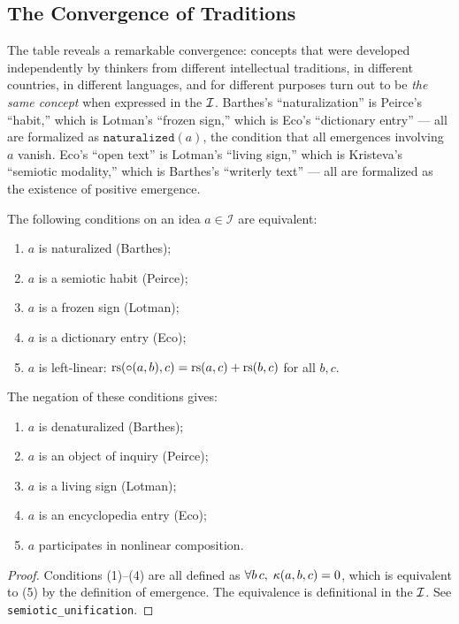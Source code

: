 \subsection{The Convergence of Traditions}

The table reveals a remarkable convergence: concepts that were developed
independently by thinkers from different intellectual traditions, in
different countries, in different languages, and for different purposes
turn out to be \emph{the same concept} when expressed in the $\mathcal{I}$.
Barthes's ``naturalization'' is Peirce's ``habit,'' which is Lotman's
``frozen sign,'' which is Eco's ``dictionary entry'' --- all are
formalized as $\texttt{naturalized}(a)$, the condition that all
emergences involving $a$ vanish. Eco's ``open text'' is Lotman's
``living sign,'' which is Kristeva's ``semiotic modality,'' which is
Barthes's ``writerly text'' --- all are formalized as the existence
of positive emergence.

\begin{theorem}
\label{thm:unification}
The following conditions on an idea $a \in \mathcal{I}$ are equivalent:
\begin{enumerate}
\item $a$ is naturalized (Barthes);
\item $a$ is a semiotic habit (Peirce);
\item $a$ is a frozen sign (Lotman);
\item $a$ is a dictionary entry (Eco);
\item $a$ is left-linear: $\mathrm{rs}(\circ(a,b), c) = \mathrm{rs}(a,c) + \mathrm{rs}(b,c)$
for all $b, c$.
\end{enumerate}
The negation of these conditions gives:
\begin{enumerate}
\item $a$ is denaturalized (Barthes);
\item $a$ is an object of inquiry (Peirce);
\item $a$ is a living sign (Lotman);
\item $a$ is an encyclopedia entry (Eco);
\item $a$ participates in nonlinear composition.
\end{enumerate}
\end{theorem}

\begin{proof}
Conditions (1)--(4) are all defined as $\forall b\,c,\;
\kappa(a, b, c) = 0$, which is equivalent to (5) by the definition
of emergence. The equivalence is definitional in the $\mathcal{I}$. See
\texttt{semiotic\_unification}.
\end{proof}

